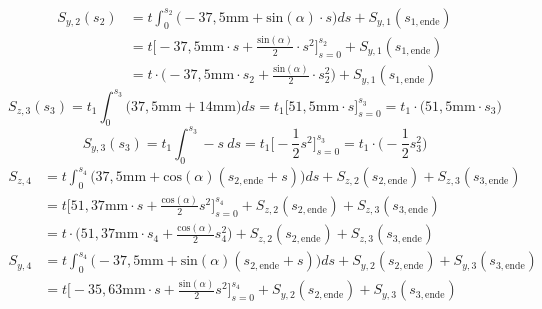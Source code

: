 \begin{itemize}
\begin{equation}
\begin{split}
	\end{split}
\end{equation}
\begin{equation}
	\begin{split}
		S_{y,2}(s_2) &= t\int_{0}^{s_2}\bigg(-37,5\mathrm{mm}+\mathrm{sin}(\alpha)\cdot s\bigg)ds + S_{y,1}(s_{1,\mathrm{ende}}) \\\
		&= t\bigg[-37,5\mathrm{mm}\cdot s +\frac{\mathrm{sin}(\alpha)}{2}\cdot s^2\bigg]_{s=0}^{s_2} + S_{y,1}(s_{1,\mathrm{ende}})\\\
		&= t\cdot\bigg(-37,5\mathrm{mm}\cdot s_2 +\frac{\mathrm{sin}(\alpha)}{2}\cdot s^2_2\bigg) + S_{y,1}(s_{1,\mathrm{ende}})
	\end{split}
\end{equation}
\begin{equation}
	S_{z,3}(s_3) = t_1\int_{0}^{s_3}\bigg(37,5\mathrm{mm}+14\mathrm{mm}\bigg)ds = t_1\bigg[51,5\mathrm{mm}\cdot s\bigg]_{s=0}^{s_3} = t_1\cdot\bigg(51,5\mathrm{mm}\cdot s_3\bigg)
\end{equation}
\begin{equation}
	S_{y,3}(s_3) = t_1\int_{0}^{s_3}-s\ ds= t_1\bigg[-\frac{1}{2}s^2\bigg]_{s=0}^{s_3} = t_1\cdot\bigg(-\frac{1}{2}s^2_3\bigg)
\end{equation}
\begin{equation}
\begin{split}
	S_{z,4} &= t\int_{0}^{s_4}\bigg(37,5\mathrm{mm}+\mathrm{cos}(\alpha)(s_{2,\mathrm{ende}}+s)\bigg)ds + S_{z,2}(s_{2,\mathrm{ende}})  + S_{z,3}(s_{3,\mathrm{ende}})\\\
	&= t\bigg[51,37\mathrm{mm}\cdot s + \frac{\mathrm{cos}(\alpha)}{2}s^2\bigg]_{s=0}^{s_4} + S_{z,2}(s_{2,\mathrm{ende}})  + S_{z,3}(s_{3,\mathrm{ende}})\\\
	&= t\cdot\bigg(51,37\mathrm{mm}\cdot s_4 + \frac{\mathrm{cos}(\alpha)}{2}s^2_4\bigg) + S_{z,2}(s_{2,\mathrm{ende}})  + S_{z,3}(s_{3,\mathrm{ende}})
\end{split}
\end{equation}
\begin{equation}
\begin{split}
	S_{y,4} &= t\int_{0}^{s_4}\bigg(-37,5\mathrm{mm}+\mathrm{sin}(\alpha)(s_{2,\mathrm{ende}}+s)\bigg)ds + S_{y,2}(s_{2,\mathrm{ende}})  + S_{y,3}(s_{3,\mathrm{ende}})\\\
	&= t\bigg[-35,63\mathrm{mm}\cdot s + \frac{\mathrm{sin}(\alpha)}{2}s^2\bigg]_{s=0}^{s_4} + S_{y,2}(s_{2,\mathrm{ende}})  + S_{y,3}(s_{3,\mathrm{ende}})\\\

\end{split}
\end{equation}
\end{itemize}
